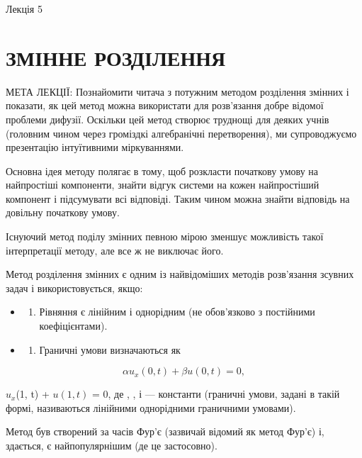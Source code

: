 \documentclass[
  ukrainian,
]{article}
\providecommand{\tightlist}{%
  \setlength{\itemsep}{0pt}\setlength{\parskip}{0pt}}
\begin{document}
Лекція 5

\section{ЗМІННЕ
РОЗДІЛЕННЯ}\label{ux437ux43cux456ux43dux43dux435-ux440ux43eux437ux434ux456ux43bux435ux43dux43dux44f}

МЕТА ЛЕКЦІЇ: Познайомити читача з потужним методом розділення змінних і
показати, як цей метод можна використати для розв'язання добре відомої
проблеми дифузії. Оскільки цей метод створює труднощі для деяких учнів
(головним чином через громіздкі алгебранічні перетворення), ми
супроводжуємо презентацію інтуїтивними міркуваннями.

Основна ідея методу полягає в тому, щоб розкласти початкову умову на
найпростіші компоненти, знайти відгук системи на кожен найпростіший
компонент і підсумувати всі відповіді. Таким чином можна знайти
відповідь на довільну початкову умову.

Існуючий метод поділу змінних певною мірою зменшує можливість такої
інтерпретації методу, але все ж не виключає його.

Метод розділення змінних є одним із найвідоміших методів розв'язання
зсувних задач і використовується, якщо:

\begin{itemize}
\tightlist
\item
  \begin{enumerate}
  \def\labelenumi{\arabic{enumi}.}
  \tightlist
  \item
    Рівняння є лінійним і однорідним (не обов'язково з постійними
    коефіцієнтами).
  \end{enumerate}
\item
  \begin{enumerate}
  \def\labelenumi{\arabic{enumi}.}
  \setcounter{enumi}{1}
  \tightlist
  \item
    Граничні умови визначаються як
  \end{enumerate}
\end{itemize}

\[
\alpha u_x(0, t) + \beta u(0, t) = 0,
\]

\gamma \(u_x\)(1, t) + \delta \(u(1, t)\) = 0, де \alpha , \beta ,
\gamma і \delta --- константи (граничні умови, задані в такій формі,
називаються лінійними однорідними граничними умовами).

Метод був створений за часів Фур'є (зазвичай відомий як метод Фур'є) і,
здається, є найпопулярнішим (де це застосовно).
\end{document}

